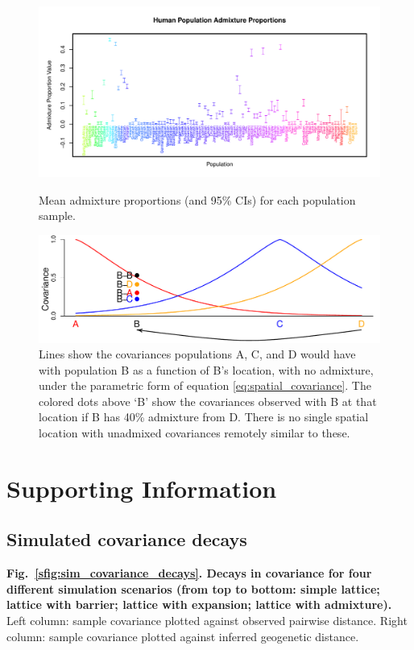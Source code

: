 \documentclass[10pt,letterpaper]{article}
\providecommand{\DIFaddbegin}{} %
\providecommand{\DIFaddend}{} %
\begin{document}
\begin{figure}
			{\includegraphics[width=\textwidth,height=0.45\textwidth]{../figs/globetrotter/globe_adprop.pdf}}
	\caption{Mean admixture proportions (and 95\% CIs) for each population sample.
	\label{globe_ad_props}
    }
\end{figure}

\begin{figure}[htp!]
	\centering
	\includegraphics[width=\textwidth]{../figs/sims/Admix_covar_toy_fig.pdf}
	\caption{
    Lines show the covariances populations A, C, and D would have with population B as a function of B's location,
    with no admixture,
    under the parametric form of equation \eqref{eq:spatial_covariance}.
    The colored dots above `B' show the covariances observed with B at that location if B has 40\% admixture from D.
    There is no single spatial location with unadmixed covariances remotely similar to these.
    } \label{sfig:toy_admixture}
\end{figure}

\DIFaddbegin \clearpage
\newpage

\DIFaddend \section*{Supporting Information}


\subsection*{Simulated covariance decays}
\label{sim_covariance_decays}
{\bf{Fig.\ \ref{sfig:sim_covariance_decays}. Decays in covariance for four different simulation scenarios (from top to bottom: simple lattice; lattice with barrier; lattice with expansion; lattice with admixture).} } Left column: sample covariance plotted against observed pairwise distance.  Right column: sample covariance plotted against inferred geogenetic distance.
\end{document}
